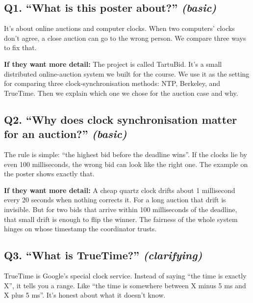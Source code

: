 \documentclass[a4paper,11pt]{article}
\begin{document}
\subsection{Q1. ``What is this poster about?'' \textnormal{\small\itshape (basic)}}

\begin{shortans}
It's about online auctions and computer clocks. When two
computers' clocks don't agree, a close auction can go to the
wrong person. We compare three ways to fix that.
\end{shortans}

\begin{deepans}
\textbf{If they want more detail:} The project is called TartuBid.
It's a small distributed online-auction system we built for the
course. We use it as the setting for comparing three
clock-synchronisation methods: NTP, Berkeley, and TrueTime. Then
we explain which one we chose for the auction case and why.
\end{deepans}

\subsection{Q2. ``Why does clock synchronisation matter for an auction?'' \textnormal{\small\itshape (basic)}}

\begin{shortans}
The rule is simple: ``the highest bid before the deadline wins''.
If the clocks lie by even 100 milliseconds, the wrong bid can
look like the right one. The example on the poster shows exactly
that.
\end{shortans}

\begin{deepans}
\textbf{If they want more detail:} A cheap quartz clock drifts
about 1 millisecond every 20 seconds when nothing corrects it.
For a long auction that drift is invisible. But for two bids that
arrive within 100 milliseconds of the deadline, that small drift
is enough to flip the winner. The fairness of the whole system
hinges on whose timestamp the coordinator trusts.
\end{deepans}

\subsection{Q3. ``What is TrueTime?'' \textnormal{\small\itshape (clarifying)}}

\begin{shortans}
TrueTime is Google's special clock service. Instead of saying
``the time is exactly X'', it tells you a range. Like ``the time
is somewhere between X minus 5 ms and X plus 5 ms''. It's honest
about what it doesn't know.
\end{shortans}
\end{document}
